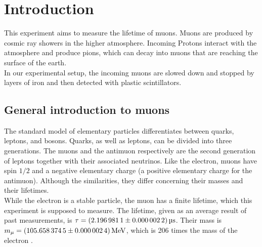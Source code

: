 \chapter{Introduction}
This experiment aims to measure the lifetime of muons. Muons are produced by cosmic ray showers in the higher atmosphere.
Incoming Protons interact with the atmosphere and produce pions, which can decay into muons that are reaching the surface of the earth. \\
In our experimental setup, the incoming muons are slowed down and stopped by layers of iron and then detected with plastic
scintillators. \\

\section{General introduction to muons}
The standard model of elementary particles differentiates between quarks, leptons, and bosons.
Quarks, as well as leptons, can be divided into three generations.
The muons and the antimuon respectively are the second generation of leptons together with their associated neutrinos.
Like the electron, muons have spin $1/2$ and a negative elementary charge (a positive elementary charge for the antimuon).
Although the similarities, they differ concerning their masses and their lifetimes. \\
While the electron is a stable particle, the muon has a finite lifetime, which this experiment is supposed to measure. 
The lifetime, given as an average result of past measurements, is $\tau = \SI{2.1969811 \pm 0.0000022}{\micro\second}$.
Their mass is $m_{\mu} = \SI{105.6583745 \pm 0.0000024}{\mega\eV}$, which is 206 times the mass of the electron \cite{pdg}.


